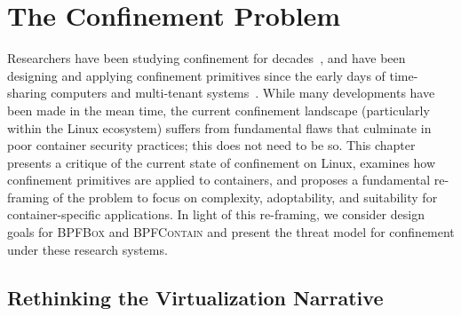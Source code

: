 \documentclass[
  fontsize=12pt,
  titlepage=firstiscover,
  paper=letter,
oneside,
  cleardoublepage=plain,
  parskip=half-,
  DIV=10,
  parindent,
  appendixprefix,
  chapterprefix,
  listof=totoc,
]{scrbook}
\newcommand{\bpfbox}{\textsc{BPFBox}}
\newcommand{\bpfcontain}{\textsc{BPFContain}}
\begin{document}
\chapter{The Confinement Problem}\label{c:confinement-problem}

Researchers have been studying confinement for decades~\cite{lampson1973_confinement}, and
have been designing and applying confinement primitives since the early days of
time-sharing computers and multi-tenant systems~\cite{shu2016_security_isolation_study}.
While many developments have been made in the mean time, the current confinement landscape
(particularly within the Linux ecosystem) suffers from fundamental flaws that culminate in
poor container security practices; this does not need to be so. This chapter presents
a critique of the current state of confinement on Linux, examines how confinement
primitives are applied to containers, and proposes a fundamental re-framing of the problem
to focus on complexity, adoptability, and suitability for container-specific applications.
In light of this re-framing, we consider design goals for \bpfbox{} and \bpfcontain{} and
present the threat model for confinement under these research systems.

\section{Rethinking the Virtualization Narrative}\label{s:cp-rethinking}
\end{document}
